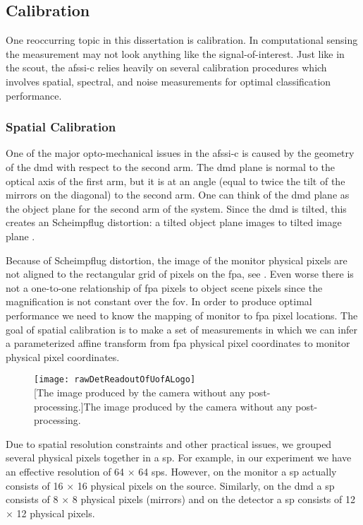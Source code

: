 \subsection{Calibration}

One reoccurring topic in this dissertation is calibration. In computational sensing the measurement may not look anything like the signal-of-interest. Just like in the \acrfull{scout}, the \gls{afssi-c} relies heavily on several calibration procedures which involves spatial, spectral, and noise measurements for optimal classification performance.


\subsubsection{Spatial Calibration}

One of the major opto-mechanical issues in the \gls{afssi-c} is caused by the geometry of the \gls{dmd} with respect to the second arm. The \gls{dmd} plane is normal to the optical axis of the first arm, but it is at an angle (equal to twice the tilt of the mirrors on the diagonal) to the second arm. One can think of the \gls{dmd} plane as the object plane for the second arm of the system. Since the \gls{dmd} is tilted, this creates an Scheimpflug distortion: a tilted object plane images to tilted image plane \cite{smith1966modern}. 

Because of Scheimpflug distortion, the image of the monitor physical pixels are not aligned to the rectangular grid of pixels on the \gls{fpa}, see . Even worse there is not a one-to-one relationship of \gls{fpa} pixels to object scene pixels since the magnification is not constant over the \gls{fov}.  In order to produce optimal performance we need to know the mapping of monitor to \gls{fpa} pixel locations. The goal of spatial calibration is to make a set of measurements in which we can infer a parameterized affine transform from \gls{fpa} physical pixel coordinates to monitor physical pixel coordinates. 


\begin{figure}[htb]
	\centering
	\texttt{[image: rawDetReadoutOfUofALogo]}\\
	[The image produced by the camera without any post-processing.]{The image produced by the camera without any post-processing.}
	\label{fig:rawDetReadoutOfUofALogo}
\end{figure}


Due to spatial resolution constraints and other practical issues, we grouped several physical pixels together in a \acrfull{sp}. For example, in our experiment we have an effective resolution of 64 $\times$ 64 \gls{sp}s. However, on the monitor a \gls{sp} actually consists of 16 $\times$ 16 physical pixels on the source. Similarly, on the \gls{dmd} a \gls{sp} consists of 8 $\times$ 8 physical pixels (mirrors) and on the detector a \gls{sp} consists of 12 $\times$ 12 physical pixels.


